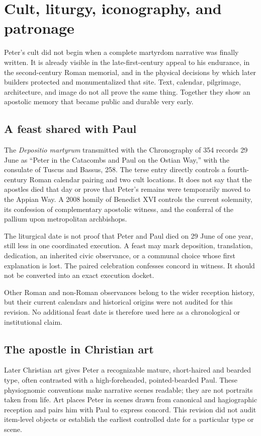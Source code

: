 \section{Cult, liturgy, iconography, and patronage}\label{sec:peter-cult}

Peter's cult did not begin when a complete martyrdom narrative was finally
written. It is already visible in the late-first-century appeal to his
endurance, in the second-century Roman memorial, and in the physical decisions
by which later builders protected and monumentalized that site. Text,
calendar, pilgrimage, architecture, and image do not all prove the same
thing. Together they show an apostolic memory that became public and durable
very early.

\subsection{A feast shared with Paul}

The \emph{Depositio martyrum} transmitted with the Chronography of 354 records
29 June as ``Peter in the Catacombs and Paul on the Ostian Way,'' with the
consulate of Tuscus and Bassus, 258. The terse entry directly controls a
fourth-century Roman calendar pairing and two cult locations. It does not say
that the apostles died that day or prove that Peter's remains were temporarily
moved to the Appian Way. A 2008 homily of Benedict XVI controls the current
solemnity, its confession of complementary apostolic witness, and the
conferral of the pallium upon metropolitan archbishops.

The liturgical date is not proof that Peter and Paul died on 29 June of one
year, still less in one coordinated execution. A feast may mark deposition,
translation, dedication, an inherited civic observance, or a communal choice
whose first explanation is lost. The paired celebration confesses concord in
witness. It should not be converted into an exact execution docket.

Other Roman and non-Roman observances belong to the wider reception history,
but their current calendars and historical origins were not audited for this
revision. No additional feast date is therefore used here as a chronological
or institutional claim.

\subsection{The apostle in Christian art}

Later Christian art gives Peter a recognizable mature, short-haired and
bearded type, often contrasted with a high-foreheaded, pointed-bearded Paul.
These physiognomic conventions make narrative scenes readable; they are not
portraits taken from life. Art places Peter in scenes drawn from canonical and
hagiographic reception and pairs him with Paul to express concord. This
revision did not audit item-level objects or establish the earliest controlled
date for a particular type or scene.

